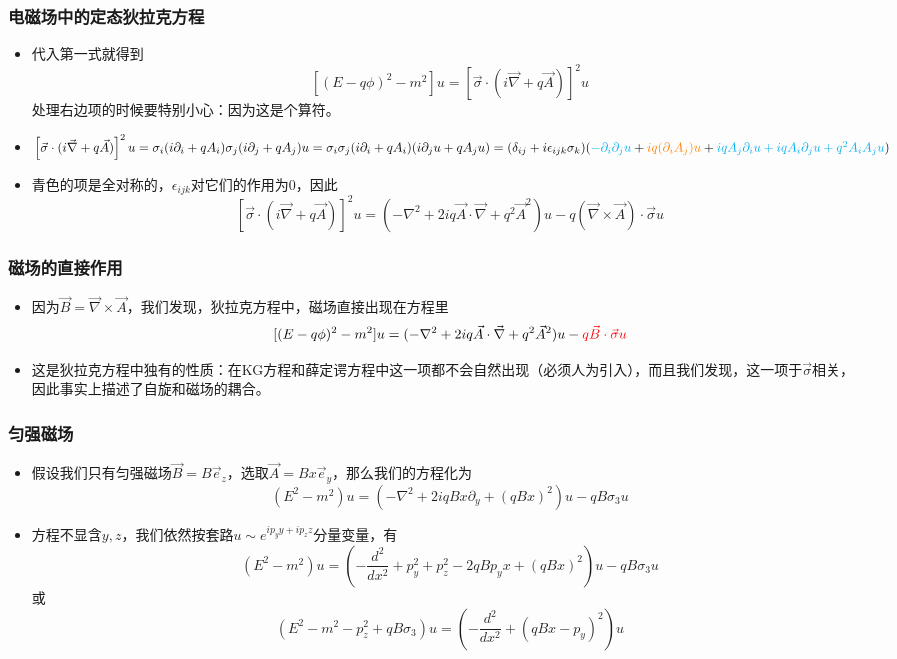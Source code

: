 \documentclass[aspectratio=1610,14pt,matheuler]{beamer}
\newcommand{\bch}{}
\newcommand{\ech}{}
\begin{document}
\begin{frame}
\frametitle{\bch 电磁场中的定态狄拉克方程 \ech}
\bch
\begin{itemize}
\item
代入第一式就得到
$$
[(E - q\phi)^2-m^2]u = \left[\vec \sigma \cdot( i\vec \nabla + q\vec A)\right]^2 u
$$
处理右边项的时候要特别小心：因为这是个算符。
\item
$\left[\vec \sigma \cdot( i\vec \nabla + q\vec A)\right]^2 u = \sigma_i (i\partial_i + qA_i) \sigma_j (i\partial_j + qA_j) u = \sigma_i \sigma_j (i\partial_i + qA_i)(i\partial_ju + qA_j u) = (\delta_{ij} + i \epsilon_{ijk}\sigma_k) ({\color{cyan}-\partial_i \partial_j u} +{\color{orange} iq(\partial_i A_j) u }+ {\color{cyan} iqA_j \partial_i u + iqA_i \partial_j u + q^2 A_i A_j u})$

\item {\color{cyan}青色}的项是全对称的，$\epsilon_{ijk}$对它们的作用为0，因此
$$
\left[\vec \sigma \cdot( i\vec \nabla + q\vec A)\right]^2 u = (-\nabla^2 + 2iq \vec A \cdot \vec \nabla + q^2 \vec A^2)u - q (\vec \nabla \times \vec A)\cdot \vec \sigma u$$
\end{itemize}
\ech
\end{frame}


\begin{frame}
\frametitle{\bch 磁场的直接作用 \ech}
\bch
\begin{itemize}
\item
因为$\vec B = \vec \nabla \times \vec A$，我们发现，狄拉克方程中，磁场直接出现在方程里
$$
[(E - q\phi)^2-m^2]u = (-\nabla^2 + 2iq \vec A \cdot \vec \nabla + q^2 \vec A^2)u -{\color{red} q \vec B \cdot \vec \sigma u}$$

\item 这是狄拉克方程中独有的性质：在KG方程和薛定谔方程中这一项都不会自然出现（必须人为引入），而且我们发现，这一项于$\vec \sigma$相关，因此事实上描述了自旋和磁场的耦合。
\end{itemize}
\ech
\end{frame}


\begin{frame}
\frametitle{\bch 匀强磁场 \ech}
\bch
\begin{itemize}
\item
假设我们只有匀强磁场$\vec B = B \vec e_z$，选取$\vec A = Bx \vec e_y$，那么我们的方程化为
$$
(E^2 - m^2) u = (-\nabla^2 + 2iq Bx \partial_y + (qBx)^2)u - q B \sigma_3 u
$$
\item
方程不显含$y,z$，我们依然按套路$u \sim e^{ip_y y + ip_z z}$分量变量，有
$$
(E^2 - m^2) u = (- \frac{d^2}{dx^2} + p_y^2 + p_z^2  - 2q Bp_y x + (qBx)^2)u - q B \sigma_3 u
$$
或
$$
(E^2 - m^2 -p_z^2 + qB \sigma_3 )u = \left(- \frac{d^2}{dx^2} +(qBx - p_y)^2\right) u
$$
\end{itemize}
\ech
\end{frame}
\end{document}
